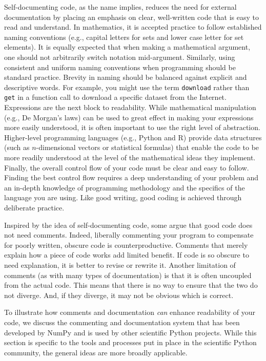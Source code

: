\documentclass[11pt,oneside,english]{article}
\begin{document}
Self-documenting code, as the name implies, reduces the need for external
documentation by placing an emphasis on clear, well-written code that is easy
to read and understand.  In mathematics, it is accepted practice to follow
established naming conventions (e.g., capital letters for sets and lower case
letter for set elements). It is equally expected that when making a
mathematical argument, one should not arbitrarily switch notation mid-argument.
Similarly, using consistent and uniform naming conventions when programming
should be standard practice. Brevity in naming should be balanced against
explicit and descriptive words. For example, you might use the term
\texttt{download} rather than \texttt{get} in a function call to download a
specific dataset from the Internet. Expressions are the next block to
readability. While mathematical manipulation (e.g., De Morgan's laws) can be
used to great effect in making your expressions more easily understood, it is
often important to use the right level of abstraction. Higher-level programming
languages (e.g., Python and R) provide data structures (such as $n$-dimensional
vectors or statistical formulas) that enable the code to be more readily
understood at the level of the mathematical ideas they implement.  Finally, the
overall control flow of your code must be clear and easy to follow. Finding the
best control flow requires a deep understanding of your problem and an in-depth
knowledge of programming methodology and the specifics of the language you are
using.  Like good writing, good coding is achieved through deliberate practice.

Inspired by the idea of self-documenting code, some argue that good code does
not need comments. Indeed, liberally commenting your program to compensate for
poorly written, obscure code is counterproductive. Comments that merely explain
how a piece of code works add limited benefit. If code is so obscure to need
explanation, it is better to revise or rewrite it. Another limitation of
comments (as with many types of documentation) is that it is often uncoupled
from the actual code. This means that there is no way to ensure that the two do
not diverge.  And, if they diverge, it may not be obvious which is correct.

To illustrate how comments and documentation \emph{can} enhance readability of
your code, we discuss the commenting and documentation system that has been
developed by NumPy and is used by other scientific Python projects. While this
section is specific to the tools and processes put in place in the scientific
Python community, the general ideas are more broadly applicable.
\end{document}
